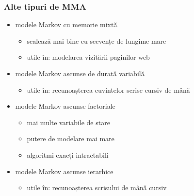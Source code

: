 \begin{frame}
  \frametitle{Alte tipuri de MMA}
  \begin{itemize}
  \item modele Markov cu memorie mixtă \citep{Saul:1999:MMM:326214.325611}
    \begin{itemize}
    \item scalează mai bine cu secvențe de lungime mare
    \item utile în: modelarea vizitării paginilor web
    \end{itemize}
    \vspace*{.5em}
  \item modele Markov ascunse de durată variabilă \citep{rabiner1989tutorial}
    \begin{itemize}
    \item utile în: recunoașterea cuvintelor scrise cursiv de mână \citep{chen1995variable}
    \end{itemize}
    \vspace*{.5em}
  \item modele Markov ascunse factoriale \citep{Ghahramani97factorialhidden}
    \begin{itemize}
    \item mai multe variabile de stare
    \item putere de modelare mai mare
    \item algoritmi exacți intractabili
    \end{itemize}
    \vspace*{.5em}
  \item modele Markov ascunse ierarhice \citep{fine1998hierarchical}
    \begin{itemize}
    \item utile în: recunoașterea scrisului de mână cursiv
    \end{itemize}
  \end{itemize}
\end{frame}